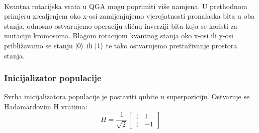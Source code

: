 \documentclass[times, utf8, zavrsni, numeric]{fer}
\begin{document}
\paragraph{}
Kvantna rotacijska vrata u QGA mogu poprimiti više namjena. U prethodnom primjeru zrcaljenjem oko x-osi zamijenjujemo vjerojatnosti pronalaska bita u oba stanja, odnosno ostvarujemo operaciju slićnu inverziji bita koja se koristi za mutaciju kromosoma. Blagom rotacijom kvantnog stanja oko x-osi ili y-osi približavamo se stanju $\ket{0}$ ili $\ket{1}$ te tako ostvarujemo pretraživanje prostora stanja.

\subsubsection{Inicijalizator populacije}
Svrha inicijalizatora populacije je postaviti qubite u superpoziciju. Ostvaruje se Hadamardovim H vratima:
\begin{equation}
H = \frac{1}{\sqrt{2}}
\begin{bmatrix}
1 & 1 \\ 1 & -1
\end{bmatrix} 
\end{equation}
\end{document}
